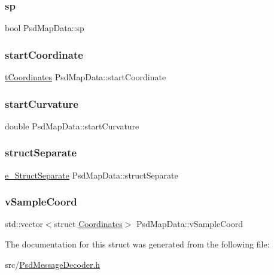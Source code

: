 \subsubsection{\texorpdfstring{sp}{sp}}
{\footnotesize\ttfamily bool Psd\+Map\+Data\+::sp}

\mbox{\label{struct_psd_map_data_ab949d9f64982e7cce89b723c95fe01b5}} 
\subsubsection{\texorpdfstring{start\+Coordinate}{startCoordinate}}
{\footnotesize\ttfamily \hyperlink{_psd_message_decoder_8h_a559ada7297c8c6c2337f9e233e73aeca}{t\+Coordinates} Psd\+Map\+Data\+::start\+Coordinate}

\mbox{\label{struct_psd_map_data_ae478c00c2ea8dc9b99ed23b4b5327cce}} 
\subsubsection{\texorpdfstring{start\+Curvature}{startCurvature}}
{\footnotesize\ttfamily double Psd\+Map\+Data\+::start\+Curvature}

\mbox{\label{struct_psd_map_data_a9f19a6ccb1eeced87a174728c3025df2}} 
\subsubsection{\texorpdfstring{struct\+Separate}{structSeparate}}
{\footnotesize\ttfamily \hyperlink{_psd_message_decoder_8h_a2ba67cb465ee836b9ce8470f32577f21}{e\+\_\+\+Struct\+Separate} Psd\+Map\+Data\+::struct\+Separate}

\mbox{\label{struct_psd_map_data_a03b022aae0167ffbdf0827f4850e8641}} 
\subsubsection{\texorpdfstring{v\+Sample\+Coord}{vSampleCoord}}
{\footnotesize\ttfamily std\+::vector$<$struct \hyperlink{struct_coordinates}{Coordinates}$>$ Psd\+Map\+Data\+::v\+Sample\+Coord}



The documentation for this struct was generated from the following file\+:\begin{DoxyCompactItemize}
\item 
src/\hyperlink{_psd_message_decoder_8h}{Psd\+Message\+Decoder.\+h}\end{DoxyCompactItemize}
